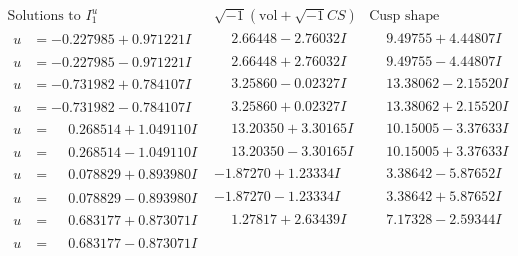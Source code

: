 \documentclass[1p]{elsarticle_modified}
\theoremstyle{definition}
\newcommand{\I}{\sqrt{-1}}
\begin{document}
$$\begin{array}{c|c|c}  
\text{Solutions to }I^u_{1}& \I (\text{vol} + \sqrt{-1}CS) & \text{Cusp shape}\\
 \hline 
\begin{aligned}
u &= -0.227985 + 0.971221 I\end{aligned}
 & \phantom{-}2.66448 - 2.76032 I & \phantom{-}9.49755 + 4.44807 I \\ \hline\begin{aligned}
u &= -0.227985 - 0.971221 I\end{aligned}
 & \phantom{-}2.66448 + 2.76032 I & \phantom{-}9.49755 - 4.44807 I \\ \hline\begin{aligned}
u &= -0.731982 + 0.784107 I\end{aligned}
 & \phantom{-}3.25860 - 0.02327 I & \phantom{-}13.38062 - 2.15520 I \\ \hline\begin{aligned}
u &= -0.731982 - 0.784107 I\end{aligned}
 & \phantom{-}3.25860 + 0.02327 I & \phantom{-}13.38062 + 2.15520 I \\ \hline\begin{aligned}
u &= \phantom{-}0.268514 + 1.049110 I\end{aligned}
 & \phantom{-}13.20350 + 3.30165 I & \phantom{-}10.15005 - 3.37633 I \\ \hline\begin{aligned}
u &= \phantom{-}0.268514 - 1.049110 I\end{aligned}
 & \phantom{-}13.20350 - 3.30165 I & \phantom{-}10.15005 + 3.37633 I \\ \hline\begin{aligned}
u &= \phantom{-}0.078829 + 0.893980 I\end{aligned}
 & -1.87270 + 1.23334 I & \phantom{-}3.38642 - 5.87652 I \\ \hline\begin{aligned}
u &= \phantom{-}0.078829 - 0.893980 I\end{aligned}
 & -1.87270 - 1.23334 I & \phantom{-}3.38642 + 5.87652 I \\ \hline\begin{aligned}
u &= \phantom{-}0.683177 + 0.873071 I\end{aligned}
 & \phantom{-}1.27817 + 2.63439 I & \phantom{-}7.17328 - 2.59344 I \\ \hline\begin{aligned}
u &= \phantom{-}0.683177 - 0.873071 I\end{aligned}

\end{array}$$
\end{document}
